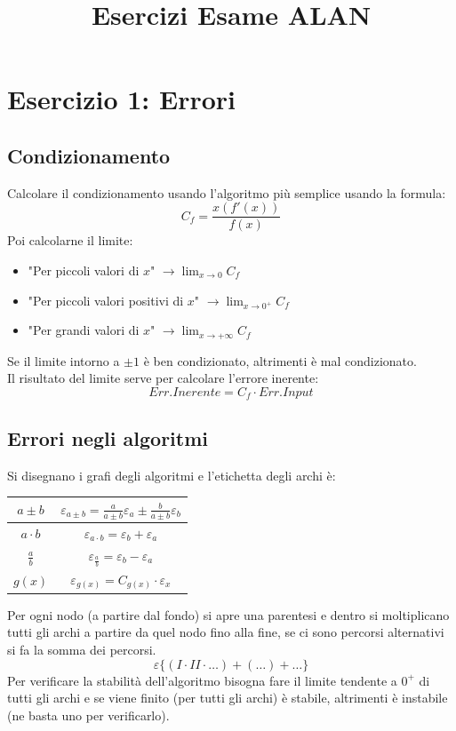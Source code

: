 \documentclass[10pt]{article}
\title{Esercizi Esame ALAN}
\author{}
\date{}
\begin{document}
\maketitle
\section{Esercizio 1: Errori}
\subsection{Condizionamento}
Calcolare il condizionamento usando l'algoritmo più semplice usando la formula:
\begin{equation*}
    C_{f}=\frac{x(f'(x))}{f(x)}
\end{equation*}
Poi calcolarne il limite:
\begin{itemize}
    \item "Per piccoli valori di $x$" $\rightarrow \lim_{x \to 0}C_{f}$
    \item "Per piccoli valori positivi di $x$" $\rightarrow \lim_{x \to 0^{+}}C_{f}$
    \item "Per grandi valori di $x$" $\rightarrow \lim_{x \to +\infty}C_{f}$
\end{itemize}
Se il limite intorno a $\pm 1$ è ben condizionato, altrimenti è mal condizionato.\\
Il risultato del limite serve per calcolare l'errore inerente:
\begin{equation*}
    Err.Inerente = C_{f}\cdot Err.Input
\end{equation*}
\subsection{Errori negli algoritmi}
Si disegnano i grafi degli algoritmi e l'etichetta degli archi è:
\begin{center}
    \begin{tabular}{|c|c|}
        \hline
        $a\pm b$ & $\varepsilon_{a\pm b}=\frac{a}{a\pm b}\varepsilon_{a}\pm\frac{b}{a\pm b}\varepsilon_{b}$\\
        \hline
        $a\cdot b$ & $\varepsilon_{a\cdot b}=\varepsilon_{b}+\varepsilon_{a}$\\
        \hline
        $\frac{a}{b}$ & $\varepsilon_{\frac{a}{b}}=\varepsilon_{b}-\varepsilon_{a}$\\
        \hline
        $g(x)$ & $\varepsilon_{g(x)}=C_{g(x)}\cdot \varepsilon_{x}$\\
        \hline
    \end{tabular}
\end{center}
Per ogni nodo (a partire dal fondo) si apre una parentesi e dentro si moltiplicano tutti gli archi a partire da quel nodo fino alla fine, se ci sono percorsi alternativi si fa la somma dei percorsi.\begin{equation*}
    \varepsilon\{(I\cdot II\cdot\ldots)+(\ldots)+\ldots\}
\end{equation*}
Per verificare la stabilità dell'algoritmo bisogna fare il limite tendente a $0^{+}$ di tutti gli archi e se viene finito (per tutti gli archi) è stabile, altrimenti è instabile (ne basta uno per verificarlo).
\end{document}
